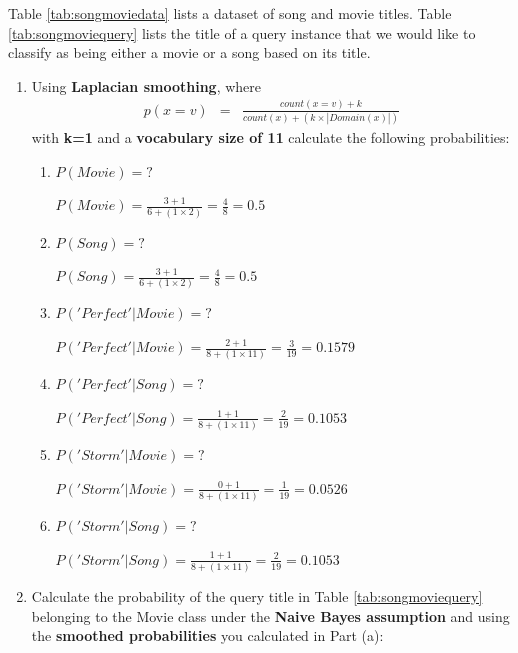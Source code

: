 \documentclass[solution]{ditpaper}
\begin{document}
\question Table \ref{tab:songmoviedata} lists a dataset of song and movie titles. Table \ref{tab:songmoviequery} lists the title of a query instance that we would like to classify as being either a movie or a song based on its title. 
	\begin{enumerate}
		\item Using \textbf{Laplacian smoothing}, where 
		\begin{eqnarray*}
		p(x=v) &=& \frac{count(x=v)+k}{count(x) +( k \times |Domain(x)|)}
		\end{eqnarray*}
		with \textbf{k=1} and a \textbf{vocabulary size of 11} calculate the following probabilities:
			\begin{enumerate}
				\item $P(Movie)=?$
					\begin{answer}
						$P(Movie) = \frac{3+1}{6 + (1 \times 2)} = \frac{4}{8} = 0.5$
					\end{answer}
				\item $P(Song)=?$
					\begin{answer}
						$P(Song) = \frac{3+1}{6 + (1 \times 2)} = \frac{4}{8} = 0.5$
					\end{answer}
				\item $P('Perfect'|Movie)=?$
					\begin{answer}
						$P('Perfect'| Movie) = \frac{2+1}{8 + (1 \times 11)} = \frac{3}{19} = 0.1579$
					\end{answer}
				\item $P('Perfect'|Song)=?$
					\begin{answer}
						$P('Perfect'|Song) = \frac{1+1}{8 + (1 \times 11)} = \frac{2}{19} = 0.1053$
					\end{answer}
				\item $P('Storm'|Movie)=?$
					\begin{answer}
						$P('Storm'|Movie) = \frac{0+1}{8 + (1 \times 11)} = \frac{1}{19} = 0.0526$
					\end{answer}
				\item $P('Storm'|Song)=?$
					\begin{answer}
						$P('Storm'|Song) = \frac{1+1}{8 + (1 \times 11)} = \frac{2}{19} = 0.1053$
					\end{answer}
			\end{enumerate}
		\item Calculate the probability of the query title in Table \ref{tab:songmoviequery} belonging to the Movie class under the \textbf{Naive Bayes assumption} and using the \textbf{smoothed probabilities} you calculated in Part (a):		

\end{enumerate}
\end{document}
